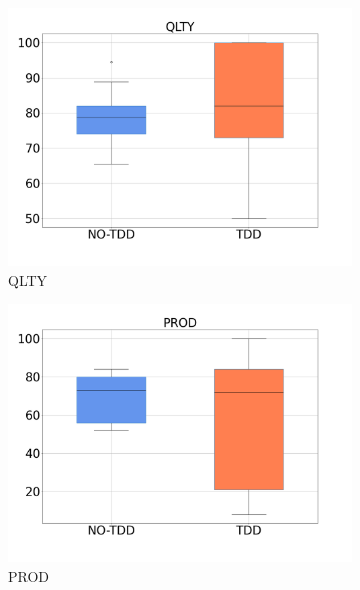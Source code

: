 \begin{figure}[H]
    \centering
    \begin{subfigure}{0.33\textwidth}
        \includegraphics[width=\linewidth]{figures/box_plots/task1_2/QLTY.png}
        \caption{QLTY}
        \label{bp_task1_2_qlty}
    \end{subfigure}\hfil
        \begin{subfigure}{0.33\textwidth}
        \includegraphics[width=\linewidth]{figures/box_plots/task1_2/PROD.png}
        \caption{PROD}
        \label{bp_task1_2_prod}
    \end{subfigure}\hfil
    \begin{subfigure}{0.33\textwidth}

\end{subfigure}
\end{figure}
